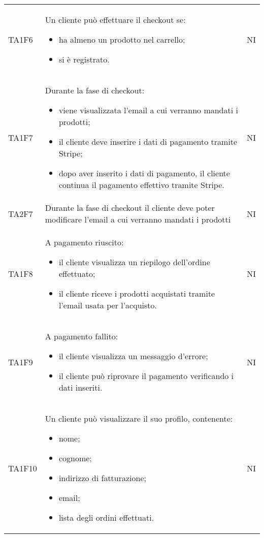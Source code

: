 {\begin{longtable}{C{3cm} C{10.2cm} C{1.5cm}}
TA1F6 & Un cliente può effettuare il checkout se:
\begin{itemize}
	\item ha almeno un prodotto nel carrello;
	\item si è registrato.
\end{itemize}
& NI\\

TA1F7 & Durante la fase di checkout:
\begin{itemize}
	\item viene visualizzata l'email a cui verranno mandati i prodotti;
	\item il cliente deve inserire i dati di pagamento tramite Stripe;
	\item dopo aver inserito i dati di pagamento, il cliente continua il pagamento effettivo tramite Stripe.
\end{itemize}
& NI\\

TA2F7 & Durante la fase di checkout il cliente deve poter modificare l'email a cui verranno mandati i prodotti
& NI\\

TA1F8 & A pagamento riuscito:
\begin{itemize}
	\item il cliente visualizza un riepilogo dell'ordine effettuato;
	\item il cliente riceve i prodotti acquistati tramite l'email usata per l'acquisto.
\end{itemize}
& NI\\

TA1F9 & A pagamento fallito:
\begin{itemize}
	\item il cliente visualizza un messaggio d'errore;
	\item il cliente può riprovare il pagamento verificando i dati inseriti.
\end{itemize}
& NI\\


TA1F10 & Un cliente può visualizzare il suo profilo, contenente:
\begin{itemize}
	\item nome;
	\item cognome;
	\item indirizzo di fatturazione;
	\item email;
	\item lista degli ordini effettuati.
\end{itemize}
& NI\\


\end{longtable}}
